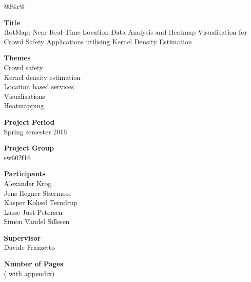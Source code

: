 
\begin{nopagebreak}
{\begin{center}
    \begin{tabular*}{\textwidth}{@{}l@{\extracolsep{\fill}}r@{}}
        \\
        \begin{minipage}[t]{0.35\textwidth}
            \textbf{Title}\\
            HotMap: Near Real-Time Location Data Analysis and Heatmap Visualisation for Crowd Safety Applications utilising Kernel Density Estimation
            
            \bigskip
            \textbf{Themes}\\
            Crowd safety\\
            Kernel density estimation\\
            Location based services\\
            Visualisations\\
            Heatmapping

            \bigskip
            \textbf{Project Period}\\
            Spring semester 2016

            \bigskip
            \textbf{Project Group}\\
            sw602f16

            \bigskip
            \textbf{Participants}\\
            Alexander Krog\\
            Jens Hegner Stærmose\\
            Kasper Kohsel Terndrup\\
            Lasse Just Petersen\\
            Simon Vandel Sillesen
            
            \bigskip
            \textbf{Supervisor}\\
            Davide Frazzetto
            

            \bigskip
            \textbf{Number of Pages}\\
            \pageref{lastPageWihoutAppendix} (\pageref{LastPage} with appendix)


\end{minipage}
\end{tabular*}
\end{center}}
\end{nopagebreak}
